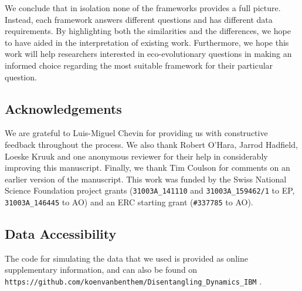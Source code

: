 We conclude that in isolation none of the frameworks provides a full picture. Instead, each framework answers different questions and has different data requirements. By highlighting both the similarities and the differences, we hope to have aided in the interpretation of existing work. Furthermore, we hope this work will help researchers interested in eco-evolutionary questions in making an informed choice regarding the most suitable framework for their particular question.

\subsection*{Acknowledgements}
We are grateful to Luis-Miguel Chevin for providing us with constructive feedback throughout the process. We also thank Robert O'Hara, Jarrod Hadfield, Loeske Kruuk and one anonymous reviewer for their help in considerably improving this manuscript. Finally, we thank Tim Coulson for comments on an earlier version of the manuscript.  This work was funded by the Swiss National Science Foundation project grants (\verb|31003A_141110| and \verb|31003A_159462/1| to EP, \verb|31003A_146445| to AO) and an ERC starting grant (\verb|#337785| to AO).

\subsection*{Data Accessibility}
The code for simulating the data that we used is provided as online supplementary information, and can also be found on  \verb|https://github.com/koenvanbenthem/Disentangling_Dynamics_IBM| . 







\printbibliography[heading=subbibliography]
